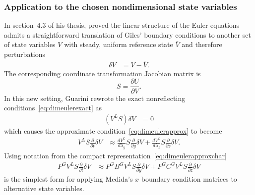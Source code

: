 \documentclass[letterpaper,11pt,nointlimits,reqno,draft]{amsbook}
\begin{document}
\subsubsection{Application to the chosen nondimensional state variables}

In section~4.3 of his thesis, \citet{Guarini1998} proved the linear
structure of the Euler equations admits a straightforward translation of Giles'
boundary conditions to another set of state variables $V$ with steady, uniform
reference state $\bar{V}$ and therefore perturbations
\begin{align}
  \label{eq:gilesperturbV}
  \delta{}V &= V - \bar{V}.
\end{align}
The corresponding coordinate transformation Jacobian matrix is
\[
   S = \frac{\partial{}U}{\partial{}V}
   .
\]
In this new setting, Guarini rewrote the exact nonreflecting
conditions~\eqref{eq:dimeulerexact} as
\begin{align}
  \left(V^L S\right) \delta{}V &= 0
\end{align}
which causes the approximate condition~\eqref{eq:dimeulerapprox} to become
\begin{align}
\label{eq:dimeulertransform}
  V^L
  S
  \frac{\partial}{\partial{}t}
  \delta{}V
  &\approx
  \frac{dV^L}{d\lambda_y}
  S
  \frac{\partial}{\partial{}y}
  \delta{}V
  +
  \frac{dV^L}{d\lambda_z}
  S
  \frac{\partial}{\partial{}z}
  \delta{}V
  .
\end{align}
Using notation from the compact representation~\eqref{eq:dimeulerapproxchar}
\begin{align}
\label{eq:dimeulertransformcharnot}
  P^G V^L S
  \frac{\partial}{\partial{}t}
  \delta{}V
  &\approx
  P^G B^G V^L S
  \frac{\partial}{\partial{}y}
  \delta{}V
  +
  P^G C^G V^L S
  \frac{\partial}{\partial{}z}
  \delta{}V
\end{align}
is the simplest form for applying Medida's $x$ boundary condition matrices to
alternative state variables.
\end{document}

